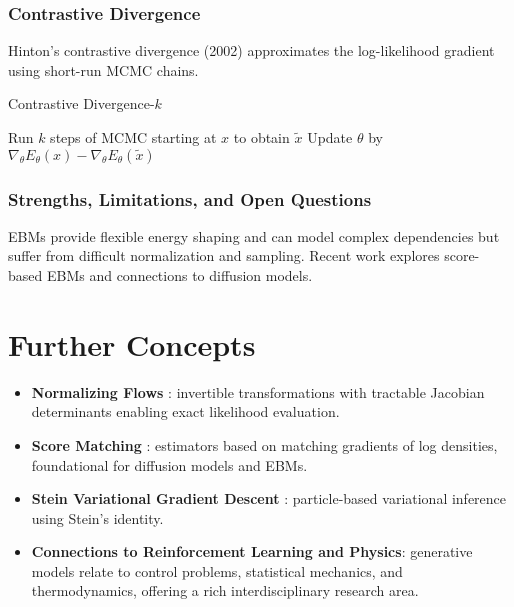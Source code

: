 \documentclass[11pt]{book}
\begin{document}
\subsection{Contrastive Divergence}
Hinton's contrastive divergence (2002) approximates the log-likelihood gradient using short-run MCMC chains.
\begin{algorithm}
\caption{Contrastive Divergence-$k$}
\begin{algorithmic}[1]
    \STATE Run $k$ steps of MCMC starting at $x$ to obtain $\tilde{x}$
    \STATE Update $\theta$ by $\nabla_\theta E_\theta(x)-\nabla_\theta E_\theta(\tilde{x})$
\ENDFOR
\end{algorithmic}
\end{algorithm}

\subsection{Strengths, Limitations, and Open Questions}
EBMs provide flexible energy shaping and can model complex dependencies but suffer from difficult normalization and sampling. Recent work explores score-based EBMs and connections to diffusion models.

\chapter{Further Concepts}
\begin{itemize}
    \item \textbf{Normalizing Flows} \cite{rezende2015}: invertible transformations with tractable Jacobian determinants enabling exact likelihood evaluation.
    \item \textbf{Score Matching} \cite{hyvarinen2005}: estimators based on matching gradients of log densities, foundational for diffusion models and EBMs.
    \item \textbf{Stein Variational Gradient Descent} \cite{liu2016}: particle-based variational inference using Stein's identity.
    \item \textbf{Connections to Reinforcement Learning and Physics}: generative models relate to control problems, statistical mechanics, and thermodynamics, offering a rich interdisciplinary research area.
\end{itemize}
\end{document}
